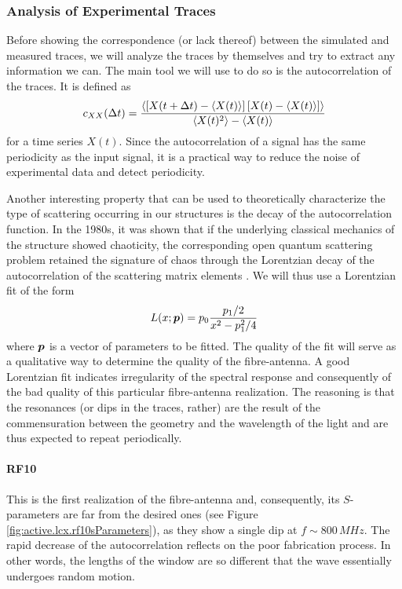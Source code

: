 \subsubsection{Analysis of Experimental Traces}
Before showing the correspondence (or lack thereof) between the
simulated and measured traces, we will analyze the traces by themselves
and try to extract any information we can. The main tool 
we will use to do so is the autocorrelation of the traces. It is defined
as 
	\begin{equation}
		c_{XX}(\Delta t) = \frac{\left\langle\left[X(t+\Delta t)-\left\langle X(t)\right\rangle\right]\left[X(t)-\left\langle X(t)\right\rangle\right]\right\rangle}{\left\langle X(t)^2\right\rangle-\left\langle X(t)\right\rangle}
	\end{equation}
for a time series $X(t)$. Since the autocorrelation of a signal has the same periodicity
as the input signal, it is a practical way to reduce the noise of experimental
data and detect periodicity. 

Another interesting property that can be used to theoretically characterize
the type of scattering occurring in our structures is the decay of the 
autocorrelation function. In the 1980s, it was shown that if the underlying
classical mechanics of the structure showed chaoticity, the corresponding
open quantum scattering problem retained the signature of chaos 
through the Lorentzian decay of the autocorrelation of the scattering matrix 
elements \cite{BLU1988,JAL1990}. We will thus use a Lorentzian fit of the form 
	\begin{equation}
		L(x;\boldsymbol{p}) = p_0 \frac{p_1/2}{x^2-p_1^2/4}
	\end{equation}
where $\boldsymbol{p}$ is a vector of parameters to be fitted. The quality of the
fit will serve as a qualitative way to determine the quality of the
fibre-antenna. A good Lorentzian fit indicates irregularity of the spectral
response and consequently of the bad quality of this particular fibre-antenna
realization. The reasoning is that the resonances (or dips in the traces, rather) are the result
of the commensuration between the geometry and the wavelength of the light and 
are thus expected to repeat periodically. 

\paragraph{RF10}
This is the first realization of the fibre-antenna and, 
consequently, its $S$-parameters are far from the desired
ones (see Figure \ref{fig:active.lcx.rf10sParameters}), as they
show a single dip at $f\sim800\,\unit{MHz}$. The rapid decrease
of the autocorrelation reflects on the poor fabrication process.
In other words, the lengths of the window are so different
that the wave essentially undergoes random motion. 

